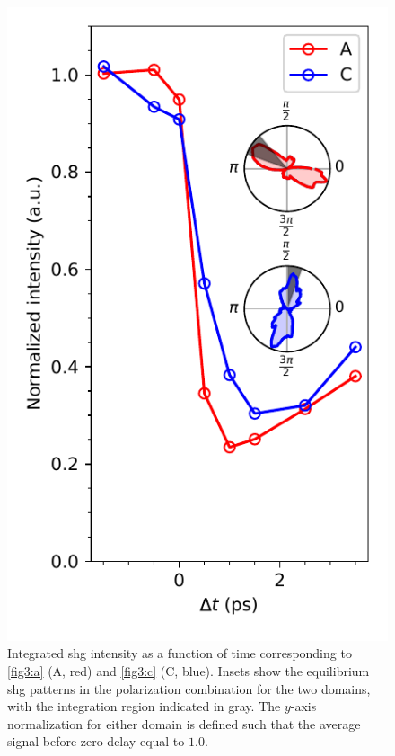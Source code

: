 \begin{figure}
\centering
\includegraphics[width=\textwidth]{./gfx/ch6/quenchtimes.pdf}
\captionsetup{singlelinecheck=off}
\caption[]{
\label{quenchtimes}
Integrated \gls{shg} intensity as a function of time corresponding to \cref{fig3:a} (A, red) and \cref{fig3:c} (C, blue).
Insets show the equilibrium \gls{shg} patterns in the \PP polarization combination for the two domains, with the integration region indicated in gray.
The $y$-axis normalization for either domain is defined such that the average signal before zero delay equal to $1.0$.
}
\end{figure}

